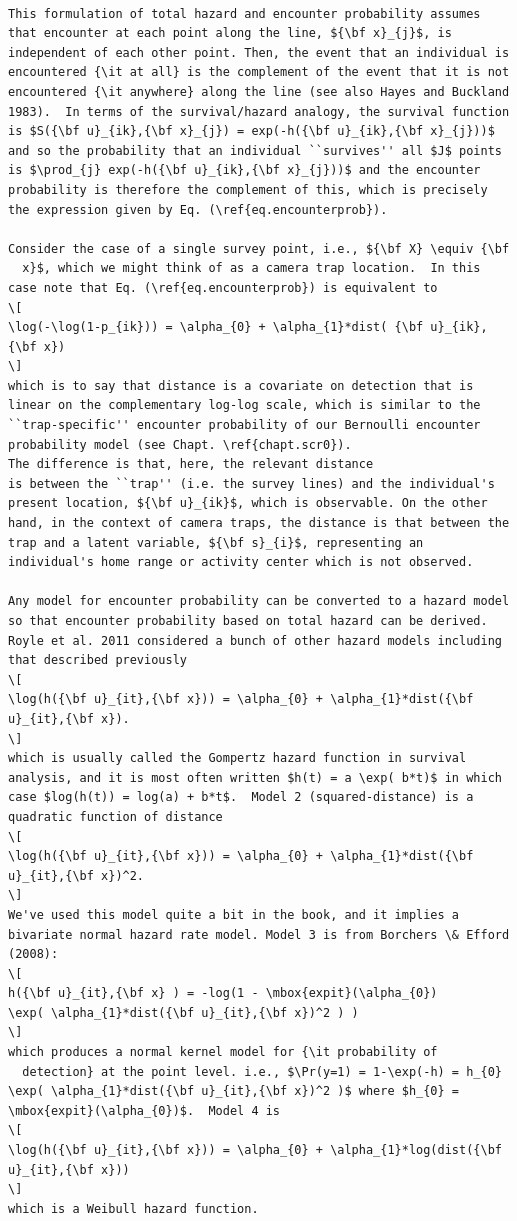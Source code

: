 \begin{verbatim}

This formulation of total hazard and encounter probability assumes
that encounter at each point along the line, ${\bf x}_{j}$, is
independent of each other point. Then, the event that an individual is
encountered {\it at all} is the complement of the event that it is not
encountered {\it anywhere} along the line (see also Hayes and Buckland
1983).  In terms of the survival/hazard analogy, the survival function
is $S({\bf u}_{ik},{\bf x}_{j}) = exp(-h({\bf u}_{ik},{\bf x}_{j}))$
and so the probability that an individual ``survives'' all $J$ points
is $\prod_{j} exp(-h({\bf u}_{ik},{\bf x}_{j}))$ and the encounter
probability is therefore the complement of this, which is precisely
the expression given by Eq. (\ref{eq.encounterprob}).

Consider the case of a single survey point, i.e., ${\bf X} \equiv {\bf
  x}$, which we might think of as a camera trap location.  In this
case note that Eq. (\ref{eq.encounterprob}) is equivalent to
\[
\log(-\log(1-p_{ik})) = \alpha_{0} + \alpha_{1}*dist( {\bf u}_{ik},{\bf x})
\]
which is to say that distance is a covariate on detection that is
linear on the complementary log-log scale, which is similar to the
``trap-specific'' encounter probability of our Bernoulli encounter
probability model (see Chapt. \ref{chapt.scr0}).
The difference is that, here, the relevant distance
is between the ``trap'' (i.e. the survey lines) and the individual's
present location, ${\bf u}_{ik}$, which is observable. On the other
hand, in the context of camera traps, the distance is that between the
trap and a latent variable, ${\bf s}_{i}$, representing an
individual's home range or activity center which is not observed.

Any model for encounter probability can be converted to a hazard model
so that encounter probability based on total hazard can be derived.
Royle et al. 2011 considered a bunch of other hazard models including
that described previously
\[
\log(h({\bf u}_{it},{\bf x})) = \alpha_{0} + \alpha_{1}*dist({\bf u}_{it},{\bf x}).
\]
which is usually called the Gompertz hazard function in survival
analysis, and it is most often written $h(t) = a \exp( b*t)$ in which
case $log(h(t)) = log(a) + b*t$.  Model 2 (squared-distance) is a
quadratic function of distance
\[
\log(h({\bf u}_{it},{\bf x})) = \alpha_{0} + \alpha_{1}*dist({\bf u}_{it},{\bf x})^2.
\]
We've used this model quite a bit in the book, and it implies a
bivariate normal hazard rate model. Model 3 is from Borchers \& Efford
(2008):
\[
h({\bf u}_{it},{\bf x} ) = -log(1 - \mbox{expit}(\alpha_{0})
\exp( \alpha_{1}*dist({\bf u}_{it},{\bf x})^2 ) )
\]
which produces a normal kernel model for {\it probability of
  detection} at the point level. i.e., $\Pr(y=1) = 1-\exp(-h) = h_{0}
\exp( \alpha_{1}*dist({\bf u}_{it},{\bf x})^2 )$ where $h_{0} =
\mbox{expit}(\alpha_{0})$.  Model 4 is
\[
\log(h({\bf u}_{it},{\bf x})) = \alpha_{0} + \alpha_{1}*log(dist({\bf u}_{it},{\bf x}))
\]
which is a Weibull hazard function.
\end{verbatim}



